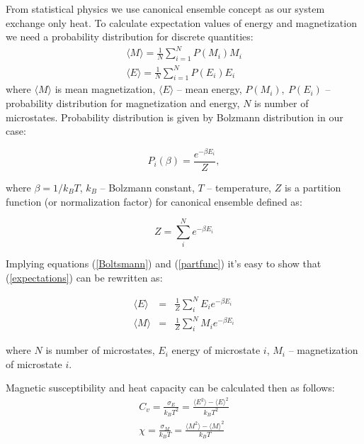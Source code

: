 \documentclass[10pt]{article}
\begin{document}
From statistical physics we use canonical ensemble concept as our system exchange only heat. To calculate expectation values of energy and magnetization we need a probability distribution for discrete quantities:
\begin{equation}\label{expectations}
\begin{aligned}
\langle M \rangle =\frac {1}{N}\sum_{i=1}^{N} P(M_i)M_i \\
\langle E \rangle = \frac {1}{N}\sum_{i=1}^{N} P(E_i)E_i
\end{aligned}
\end{equation}
where $\langle M \rangle$ is mean magnetization, $\langle E \rangle$ -- mean energy,
$P(M_i),\ P(E_i)$ -- probability distribution for magnetization and energy, $N$ is number of microstates.
Probability distribution is given by Bolzmann distribution in our case:

\begin{equation}\label{Boltsmann}
P_i(\beta)=\frac {e^{-\beta E_i}}{Z},
\end{equation}

where $\beta = 1/k_BT$, $k_B$ -- Bolzmann constant, $T$ -- temperature, $Z$ is a partition function (or
normalization factor) for canonical ensemble defined as:

\begin{equation}\label{partfunc}
Z=\sum_{i}^{N}e^{-\beta E_{i}}
\end{equation}

Implying equations (\ref{Boltsmann}) and (\ref{partfunc}) it's easy to show that (\ref{expectations}) can be rewritten as:

\begin{equation}
\begin{aligned}
\langle E\rangle &=&\frac{1}{Z}\sum_{i}^{N}E_{i}e^{-\beta E_{i}} \\
\langle M\rangle &=&\frac{1}{Z}\sum_{i}^{N}M_{i}e^{-\beta E_{i}}
\end{aligned}
\end{equation}

where $N$ is number of microstates, $E_{i}$ energy of microstate $i$, $M_{i}$ -- magnetization of microstate $i$. 

Magnetic susceptibility and heat capacity can be calculated then as follows: 
\begin{equation}\label{cv_xi}
\begin{aligned}
C_{v}=\frac{\sigma _{E}}{k_{B}T^{2}}=\frac{\langle E^{2}\rangle -\langle E\rangle ^{2}}{k_{B}T^2} \\
\chi =\frac{\sigma _{M}}{k_{B}T}=\frac{\langle M^{2}\rangle -\langle M\rangle ^{2}}{k_{B}T}
\end{aligned}
\end{equation}
\end{document}
